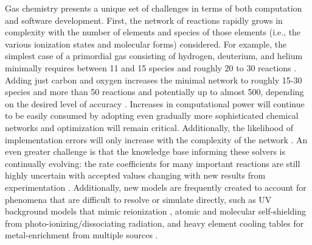 Gas chemistry presents a unique set of challenges in terms of
both computation and software development.  First, the network of
reactions rapidly grows in complexity with the number of elements and
species of those elements (i.e., the various ionization states and
molecular forms) considered.  For example, the simplest case of a
primordial gas consisting of hydrogen, deuterium, and helium minimally
requires between 11 and 15 species and roughly 20 to 30 reactions
\citep{1997NewA....2..181A, 1998A&A...335..403G}.
Adding just carbon and oxygen increases the minimal network to 
roughly 15-30 species and more than 50 reactions
and potentially up to almost 500, depending on the desired level of
accuracy \citep{2005ApJ...626..627O, 2012MNRAS.421..116G}.  Increases in
computational power will continue to be easily consumed by adopting
even gradually more sophisticated chemical networks and optimization
will remain critical.  Additionally, the likelihood of implementation
errors will only increase with the complexity of the network
\citep{taschuk2017ten}. An even greater challenge is that the
knowledge base
informing these solvers is continually evolving: the rate
coefficients for many important reactions are still highly uncertain
\citep{2008MNRAS.388.1627G, 2011ApJ...726...55T} with accepted values
changing with new results from experimentation
\citep{2010Sci...329...69K, 2015ApJS..219....6O, 2016ApJ...816...31D}.
Additionally, new models are frequently created to account for
phenomena that are difficult to resolve or simulate directly, such as
UV background models that mimic reionization
\citep[e.g.,][]{1996ApJ...461...20H, 2001cghr.confE..64H,
2012ApJ...746..125H, 2009ApJ...703.1416F}, atomic
\citep{2013MNRAS.430.2427R} and molecular \citep{1996ApJ...468..269D,
2012MNRAS.425L..51W} self-shielding from photo-ionizing/dissociating
radiation, and heavy element cooling tables for metal-enrichment from
multiple sources \citep[e.g.,][]{2009MNRAS.393...99W,
2013MNRAS.433.3005D}.

